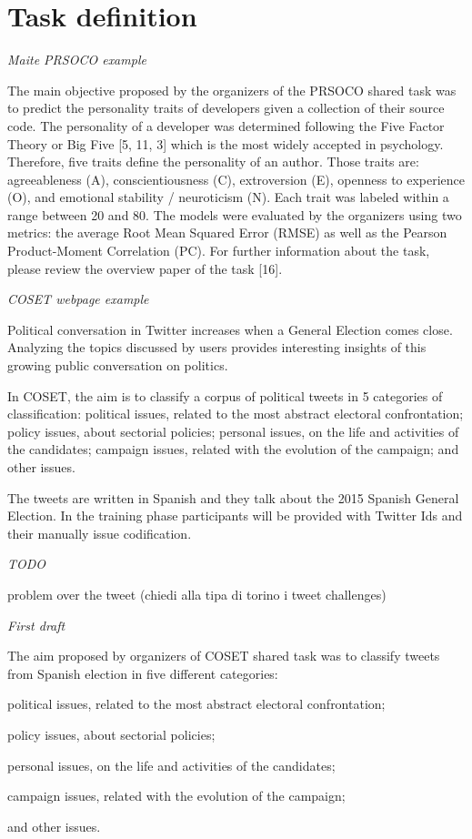 \section{Task definition} \label{sec:task}


\emph{Maite PRSOCO example}

The main objective proposed by the organizers of the PRSOCO shared task was to predict the personality traits of developers given a collection of their source code. The personality of a developer was determined following the Five Factor Theory or Big Five [5, 11, 3] which is the most widely accepted in psychology. Therefore, five traits define the personality of an author. Those traits are: agreeableness (A), conscientiousness (C), extroversion (E), openness to experience (O), and emotional stability / neuroticism (N). Each trait was labeled within a range between 20 and 80. The models were evaluated by the organizers using two metrics: the average Root Mean Squared Error (RMSE) as well as the Pearson Product-Moment Correlation (PC). For further information about the task, please review the overview paper of the task [16].


\emph{COSET webpage example}

Political conversation in Twitter increases when a General Election comes close. Analyzing the topics discussed by users provides interesting insights of this growing public conversation on politics.

In COSET, the aim is to classify a corpus of political tweets in 5 categories of classification: political issues, related to the most abstract electoral confrontation; policy issues, about sectorial policies; personal issues, on the life and activities of the candidates; campaign issues, related with the evolution of the campaign; and other issues.

The tweets are written in Spanish and they talk about the 2015 Spanish General Election. In the training phase participants will be provided with Twitter Ids and their manually issue codification.

\emph{TODO }

problem over the tweet (chiedi alla tipa di torino i tweet challenges)

\emph{First draft}

The aim proposed by organizers of COSET shared task was to classify tweets from Spanish election in five different categories:
\begin{enumerate*}
\item political issues, related to the most abstract electoral confrontation; 
\item policy issues, about sectorial policies; 
\item personal issues, on the life and activities of the candidates; 
\item campaign issues, related with the evolution of the campaign;
\item and other issues.
\end{enumerate*}

